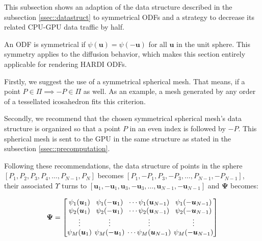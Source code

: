 \documentclass[twoside,twocolumn,10pt]{article}
\begin{document}
This subsection shows an adaption of the data structure described in the subsection \ref{ssec::datastruct} to symmetrical ODFs and a strategy to decrease its related CPU-GPU data traffic by half.

An ODF is symmetrical if $\psi(\bm{u}) = \psi(-\bm{u})$ for all $\bm{u}$ in the unit sphere. This symmetry applies to the diffusion behavior, which makes this section entirely applicable for rendering HARDI ODFs.%

Firstly, we suggest the use of a symmetrical spherical mesh. That means, if a point $P \in \Pi \implies -P \in \Pi$ as well. As an example, a mesh generated by any order of a tessellated icosahedron fits this criterion.

Secondly, we recommend that the chosen symmetrical spherical mesh's data structure is organized so that a point $P$ in an even index is followed by $-P$. This spherical mesh is sent to the GPU in the same structure as stated in the subsection \ref{ssec::precomputation}.


Following these recommendations, the data structure of points in the sphere $[P_1, P_2, P_3, P_4, \dots, P_{N-1}, P_N]$ becomes $[P_1, -P_1, P_3, -P_3, \dots, P_{N-1}, -P_{N-1}]$, their associated $\Upsilon$ turns to $[\bm{u}_1, -\bm{u}_1, \bm{u}_3, -\bm{u}_3, \dots, \bm{u}_{N-1}, -\bm{u}_{N-1}]$ and $\bm{\Psi}$ becomes:

\begin{equation*}
\bm{\Psi} = 
\begingroup %
\setlength\arraycolsep{2pt}
\begin{bmatrix} 
    \psi_1(\bm{u}_1) & \psi_1(-\bm{u}_1) & \cdots \psi_1(\bm{u}_{N-1}) & \psi_1(-\bm{u}_{N-1})  \\
     \psi_2(\bm{u}_1)& \psi_2(-\bm{u}_1) & \cdots \psi_2(\bm{u}_{N-1}) & \psi_2(-\bm{u}_{N-1}) \\

    \vdots & \vdots & \vdots & \vdots  \\
     \psi_M(\bm{u}_1)&\psi_M(-\bm{u}_1) & \cdots \psi_M(\bm{u}_{N-1}) & \psi_M(-\bm{u}_{N-1})
\end{bmatrix}
\endgroup
\end{equation*}
\end{document}
